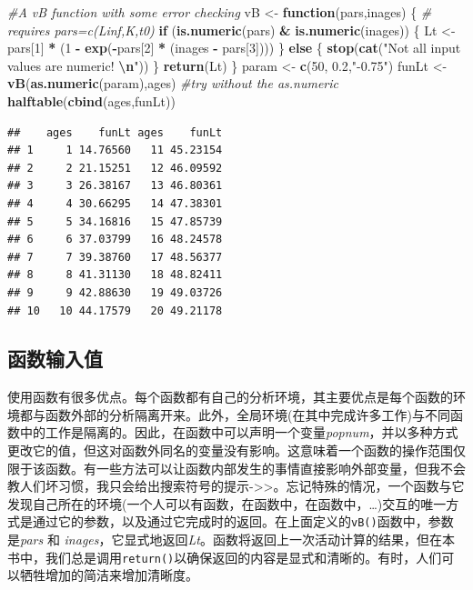 \documentclass[
  lang=cn,
  11pt,
  scheme=chinese,
  chinesefont=nofont,
  citestyle=gb7714-2015,
  bibstyle=gb7714-2015]{elegantbook}
\newenvironment{Shaded}{\begin{snugshade}}{\end{snugshade}}
\newcommand{\CommentTok}[1]{\textcolor[rgb]{0.56,0.35,0.01}{\textit{#1}}}
\newcommand{\ControlFlowTok}[1]{\textcolor[rgb]{0.13,0.29,0.53}{\textbf{#1}}}
\newcommand{\DecValTok}[1]{\textcolor[rgb]{0.00,0.00,0.81}{#1}}
\newcommand{\FloatTok}[1]{\textcolor[rgb]{0.00,0.00,0.81}{#1}}
\newcommand{\FunctionTok}[1]{\textcolor[rgb]{0.13,0.29,0.53}{\textbf{#1}}}
\newcommand{\NormalTok}[1]{#1}
\newcommand{\OtherTok}[1]{\textcolor[rgb]{0.56,0.35,0.01}{#1}}
\newcommand{\SpecialCharTok}[1]{\textcolor[rgb]{0.81,0.36,0.00}{\textbf{#1}}}
\newcommand{\StringTok}[1]{\textcolor[rgb]{0.31,0.60,0.02}{#1}}
\begin{document}
\begin{Shaded}
\begin{Highlighting}[]
 \CommentTok{\#A vB function with some error checking  }
\NormalTok{vB }\OtherTok{\textless{}{-}} \ControlFlowTok{function}\NormalTok{(pars,inages) \{ }\CommentTok{\# requires pars=c(Linf,K,t0)  }
  \ControlFlowTok{if}\NormalTok{ (}\FunctionTok{is.numeric}\NormalTok{(pars) }\SpecialCharTok{\&} \FunctionTok{is.numeric}\NormalTok{(inages)) \{  }
\NormalTok{    Lt }\OtherTok{\textless{}{-}}\NormalTok{ pars[}\DecValTok{1}\NormalTok{] }\SpecialCharTok{*}\NormalTok{ (}\DecValTok{1} \SpecialCharTok{{-}} \FunctionTok{exp}\NormalTok{(}\SpecialCharTok{{-}}\NormalTok{pars[}\DecValTok{2}\NormalTok{] }\SpecialCharTok{*}\NormalTok{ (inages }\SpecialCharTok{{-}}\NormalTok{ pars[}\DecValTok{3}\NormalTok{])))  }
\NormalTok{  \} }\ControlFlowTok{else}\NormalTok{ \{ }\FunctionTok{stop}\NormalTok{(}\FunctionTok{cat}\NormalTok{(}\StringTok{"Not all input values are numeric! }\SpecialCharTok{\textbackslash{}n}\StringTok{"}\NormalTok{)) \}  }
  \FunctionTok{return}\NormalTok{(Lt)  }
\NormalTok{\}  }
\NormalTok{param }\OtherTok{\textless{}{-}} \FunctionTok{c}\NormalTok{(}\DecValTok{50}\NormalTok{, }\FloatTok{0.2}\NormalTok{,}\StringTok{"{-}0.75"}\NormalTok{)  }
\NormalTok{funLt }\OtherTok{\textless{}{-}} \FunctionTok{vB}\NormalTok{(}\FunctionTok{as.numeric}\NormalTok{(param),ages) }\CommentTok{\#try without the as.numeric  }
\FunctionTok{halftable}\NormalTok{(}\FunctionTok{cbind}\NormalTok{(ages,funLt))  }
\end{Highlighting}
\end{Shaded}

\begin{verbatim}
##    ages    funLt ages    funLt
## 1     1 14.76560   11 45.23154
## 2     2 21.15251   12 46.09592
## 3     3 26.38167   13 46.80361
## 4     4 30.66295   14 47.38301
## 5     5 34.16816   15 47.85739
## 6     6 37.03799   16 48.24578
## 7     7 39.38760   17 48.56377
## 8     8 41.31130   18 48.82411
## 9     9 42.88630   19 49.03726
## 10   10 44.17579   20 49.21178
\end{verbatim}

\subsection{函数输入值}\label{ux51fdux6570ux8f93ux5165ux503c}

使用函数有很多优点。每个函数都有自己的分析环境，其主要优点是每个函数的环境都与函数外部的分析隔离开来。此外，全局环境(在其中完成许多工作)与不同函数中的工作是隔离的。因此，在函数中可以声明一个变量\emph{popnum}，并以多种方式更改它的值，但这对函数外同名的变量没有影响。这意味着一个函数的操作范围仅限于该函数。有一些方法可以让函数内部发生的事情直接影响外部变量，但我不会教人们坏习惯，我只会给出搜索符号的提示-\textgreater\textgreater。忘记特殊的情况，一个函数与它发现自己所在的环境(一个人可以有函数，在函数中，在函数中，\ldots)交互的唯一方式是通过它的参数，以及通过它完成时的返回。在上面定义的\texttt{vB()}函数中，参数是\emph{pars} 和 \emph{inages}，它显式地返回\emph{Lt}。函数将返回上一次活动计算的结果，但在本书中，我们总是调用\texttt{return()}以确保返回的内容是显式和清晰的。有时，人们可以牺牲增加的简洁来增加清晰度。
\end{document}
